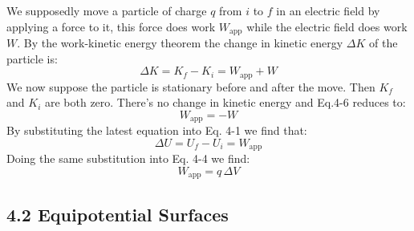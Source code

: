 \documentclass[12pt, a4paper]{article}
\begin{document}
		We supposedly move a particle of charge $q$ from $i$ to $f$ in an electric field by applying a force to it, this force does work $W_{\text{app}}$ while the electric field does work $W$. By the work-kinetic energy theorem the change in kinetic energy $\Delta K$ of the particle is:
		\begin{equation*}
			\Delta K = K_f - K_i = W_{\text{app}} + W
			\tag{4-6}
		\end{equation*}
		We now suppose the particle is stationary before and after the move. Then $K_f$ and $K_i$ are both zero. There's no change in kinetic energy and Eq.4-6 reduces to:
		\begin{equation*}
			W_{\text{app}} = -W
			\tag{4-7}
		\end{equation*}
		By substituting the latest equation into Eq. 4-1 we find that:
		\begin{equation*}
			\Delta U = U_f - U_i = W_{\text{app}}
			\tag{4-8}
		\end{equation*}
		Doing the same substitution into Eq. 4-4 we find:
		\begin{equation*}
			W_{\text{app}} = q \, \Delta V
			\tag{4-9}
		\end{equation*}
		
		
		
		\subsection*{4.2 Equipotential Surfaces}
		
\end{document}
